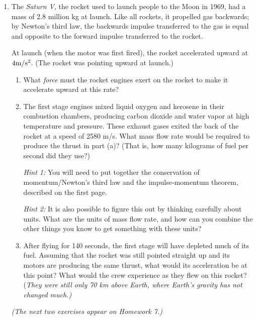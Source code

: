 \documentclass[12pt]{article}
\begin{document}
\begin{enumerate}

	\item The {\it Saturn V}, the rocket used to launch people to the Moon in 1969, had a mass of 2.8 million kg at launch. Like all rockets, it propelled gas backwards; by Newton's third law, the backwards impulse transferred to the gas is equal and opposite to the forward impulse transferred to the rocket. 

		At launch (when the motor was first fired), the rocket accelerated upward at $4 \rm m/\rm s^2$. (The rocket was pointing upward at launch.)

		\begin{enumerate}
			\item What {\it force} must the rocket engines exert on the rocket to make it accelerate upward at this rate?
			
			\vspace{1.5in}
			
			\item {The first stage engines mixed liquid oxygen and kerosene in their combustion chambers, producing carbon dioxide and water vapor at high temperature and pressure. These exhaust gases exited the back
				of the rocket at a speed of 2580 m/s. What mass flow rate would be required to produce the thrust in part (a)? (That is, how many kilograms of fuel per second did they use?)

				{\it Hint 1:} You will need to put together the conservation of momentum/Newton's third law and the impulse-momentum theorem, described on the first page.

				{\it Hint 2:} It is also possible to figure this out by thinking carefully about units. What are the units of mass flow rate, and how can you combine the other things you know to get something with these units?
\newpage
				}
			\item After flying for 140 seconds, the first stage will have depleted much of its fuel. Assuming that the rocket was still pointed straight up and its motors are producing the same thrust, what would its acceleration be at this point? What would the crew experience as they flew on this rocket? {(\it They were still only 70 km above Earth, where Earth's gravity has not changed much.)}
		\end{enumerate}

\newpage

		{\it (The next two exercises appear on Homework 7.)}


\end{enumerate}
\end{document}

